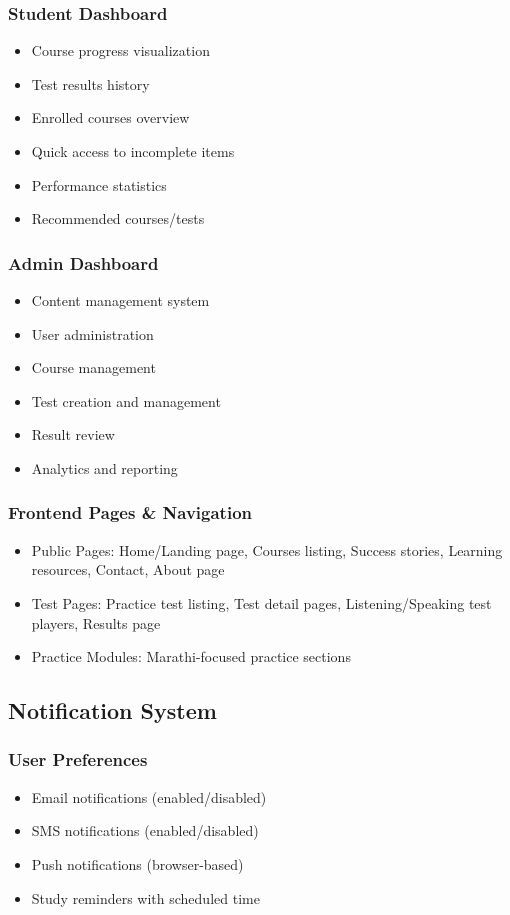\documentclass{article}
\begin{document}
\subsubsection{Student Dashboard}
\begin{itemize}
    \item Course progress visualization
    \item Test results history
    \item Enrolled courses overview
    \item Quick access to incomplete items
    \item Performance statistics
    \item Recommended courses/tests
\end{itemize}

\subsubsection{Admin Dashboard}
\begin{itemize}
    \item Content management system
    \item User administration
    \item Course management
    \item Test creation and management
    \item Result review
    \item Analytics and reporting
\end{itemize}

\subsubsection{Frontend Pages \& Navigation}
\begin{itemize}
    \item Public Pages: Home/Landing page, Courses listing, Success stories, Learning resources, Contact, About page
    \item Test Pages: Practice test listing, Test detail pages, Listening/Speaking test players, Results page
    \item Practice Modules: Marathi-focused practice sections
\end{itemize}

\subsection{Notification System}

\subsubsection{User Preferences}
\begin{itemize}
    \item Email notifications (enabled/disabled)
    \item SMS notifications (enabled/disabled)
    \item Push notifications (browser-based)
    \item Study reminders with scheduled time
\end{itemize}
\end{document}
